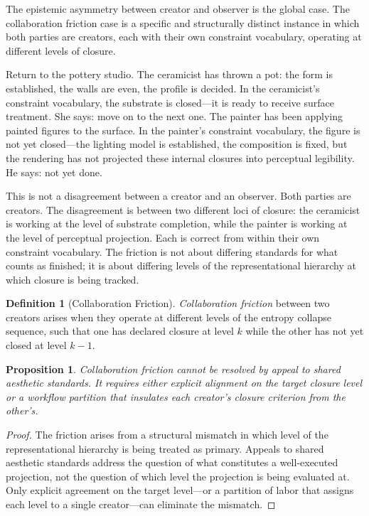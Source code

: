 \documentclass[11pt, twoside]{article}
\theoremstyle{plain}
\newtheorem{proposition}[theorem]{Proposition}
\theoremstyle{definition}
\newtheorem{definition}[theorem]{Definition}
\theoremstyle{remark}
\begin{document}
The epistemic asymmetry between creator and observer is the global case. The collaboration friction case is a specific and structurally distinct instance in which both parties are creators, each with their own constraint vocabulary, operating at different levels of closure.

Return to the pottery studio. The ceramicist has thrown a pot: the form is established, the walls are even, the profile is decided. In the ceramicist's constraint vocabulary, the substrate is closed---it is ready to receive surface treatment. She says: move on to the next one. The painter has been applying painted figures to the surface. In the painter's constraint vocabulary, the figure is not yet closed---the lighting model is established, the composition is fixed, but the rendering has not projected these internal closures into perceptual legibility. He says: not yet done.

This is not a disagreement between a creator and an observer. Both parties are creators. The disagreement is between two different loci of closure: the ceramicist is working at the level of substrate completion, while the painter is working at the level of perceptual projection. Each is correct from within their own constraint vocabulary. The friction is not about differing standards for what counts as finished; it is about differing levels of the representational hierarchy at which closure is being tracked.

\begin{definition}[Collaboration Friction]
\emph{Collaboration friction} between two creators arises when they operate at different levels of the entropy collapse sequence, such that one has declared closure at level $k$ while the other has not yet closed at level $k-1$.
\end{definition}

\begin{proposition}
\label{prop:friction}
Collaboration friction cannot be resolved by appeal to shared aesthetic standards. It requires either explicit alignment on the target closure level or a workflow partition that insulates each creator's closure criterion from the other's.
\end{proposition}

\begin{proof}
The friction arises from a structural mismatch in which level of the representational hierarchy is being treated as primary. Appeals to shared aesthetic standards address the question of what constitutes a well-executed projection, not the question of which level the projection is being evaluated at. Only explicit agreement on the target level---or a partition of labor that assigns each level to a single creator---can eliminate the mismatch.
\end{proof}
\end{document}
